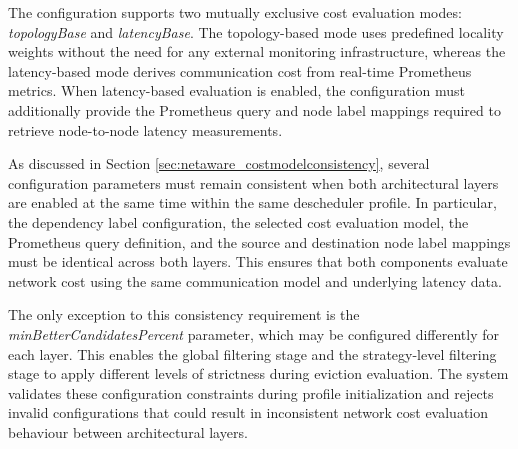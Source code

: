 The configuration supports two mutually exclusive cost evaluation modes: \textit{topologyBase} and \textit{latencyBase}. The topology-based mode uses predefined locality weights without the need for any external monitoring infrastructure, whereas the latency-based mode derives communication cost from real-time Prometheus metrics. When latency-based evaluation is enabled, the configuration must additionally provide the Prometheus query and node label mappings required to retrieve node-to-node latency measurements.

As discussed in Section \ref{sec:netaware_costmodelconsistency}, several configuration parameters must remain consistent when both architectural layers are enabled at the same time within the same descheduler profile. In particular, the dependency label configuration, the selected cost evaluation model, the Prometheus query definition, and the source and destination node label mappings must be identical across both layers. This ensures that both components evaluate network cost using the same communication model and underlying latency data.

The only exception to this consistency requirement is the \textit{minBetterCandidatesPercent} parameter, which may be configured differently for each layer. This enables the global filtering stage and the strategy-level filtering stage to apply different levels of strictness during eviction evaluation. The system validates these configuration constraints during profile initialization and rejects invalid configurations that could result in inconsistent network cost evaluation behaviour between architectural layers.
